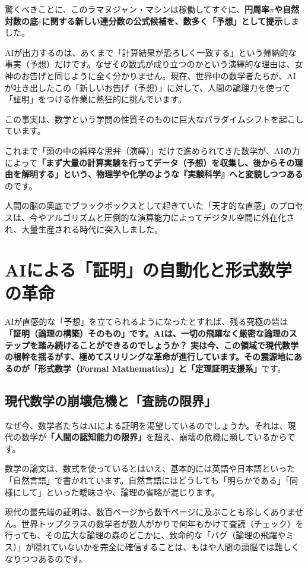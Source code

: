 驚くべきことに、このラマヌジャン・マシンは稼働してすぐに、\textbf{円周率\(\pi\)や自然対数の底\(e\)に関する新しい連分数の公式候補を、数多く「予想」として提示}しました。

AIが出力するのは、あくまで「計算結果が恐ろしく一致する」という帰納的な事実（予想）だけです。なぜその数式が成り立つのかという演繹的な理由は、女神のお告げと同じように全く分かりません。現在、世界中の数学者たちが、AIが吐き出したこの「新しいお告げ（予想）」に対して、人間の論理力を使って「証明」をつける作業に熱狂的に挑んでいます。

この事実は、数学という学問の性質そのものに巨大なパラダイムシフトを起こしています。

これまで「頭の中の純粋な思弁（演繹）」だけで進められてきた数学が、AIの力によって\textbf{「まず大量の計算実験を行ってデータ（予想）を収集し、後からその理由を解明する」という、物理学や化学のような『実験科学』へと変貌しつつある}のです。

人間の脳の奥底でブラックボックスとして起きていた「天才的な直感」のプロセスは、今やアルゴリズムと圧倒的な演算能力によってデジタル空間に外在化され、大量生産される時代に突入しました。

\section{AIによる「証明」の自動化と形式数学の革命}

AIが直感的な「予想」を立てられるようになったとすれば、残る究極の砦は\textbf{「証明（論理の構築）そのもの」です。AIは、一切の飛躍なく厳密な論理のステップを踏み続けることができるのでしょうか？ 実は今、この領域で現代数学の根幹を揺るがす、極めてスリリングな革命が進行しています。その震源地にあるのが「形式数学（Formal Mathematics）」と「定理証明支援系」}です。

\subsection{現代数学の崩壊危機と「査読の限界」}

なぜ今、数学者たちはAIによる証明を渇望しているのでしょうか。それは、現代の数学が\textbf{「人間の認知能力の限界」}を超え、崩壊の危機に瀕しているからです。

数学の論文は、数式を使っているとはいえ、基本的には英語や日本語といった「自然言語」で書かれています。自然言語にはどうしても「明らかである」「同様にして」といった曖昧さや、論理の省略が混じります。

現代の最先端の証明は、数百ページから数千ページに及ぶことも珍しくありません。世界トップクラスの数学者が数人がかりで何年もかけて査読（チェック）を行っても、その広大な論理の森のどこかに、致命的な「バグ（論理の飛躍やミス）」が隠れていないかを完全に確信することは、もはや人間の頭脳では難しくなりつつあるのです。

